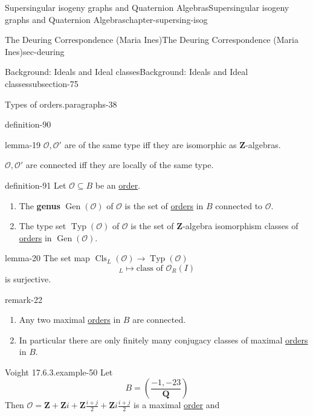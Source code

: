 \documentclass[oneside,10pt,]{book}
\newcommand{\terminology}[1]{\textbf{#1}}
\numberwithin{equation}{section}
\newcommand{\legendre}[2]{\left(\frac{#1}{#2}\right)}
\newcommand{\ZZ}{\mathbf{Z}}
\newcommand{\QQ}{\mathbf{Q}}
\newcommand{\ints}{\mathcal{O}}
\begin{document}
\begin{chapterptx}{Supersingular isogeny graphs and Quaternion Algebras}{}{Supersingular isogeny graphs and Quaternion Algebras}{}{}{chapter-supersing-isog}
\begin{sectionptx}{The Deuring Correspondence (Maria Ines)}{}{The Deuring Correspondence (Maria Ines)}{}{}{sec-deuring}
\begin{subsectionptx}{Background: Ideals and Ideal classes}{}{Background: Ideals and Ideal classes}{}{}{subsection-75}
\begin{paragraphs}{Types of orders.}{paragraphs-38}
\begin{definition}{}{definition-90}
\end{definition}
\begin{lemma}{}{}{lemma-19}%
\hypertarget{p-950}{}%
\(\ints,\ints'\) are of the same type iff they are isomorphic as \(\ZZ\)-algebras.%
\par
\hypertarget{p-951}{}%
\(\ints,\ints'\) are connected iff they are locally of the same type.%
\end{lemma}
\begin{definition}{}{definition-91}%
\hypertarget{p-952}{}%
Let \(\ints \subseteq B\) be an \hyperref[def-order-quaternion]{order}.\leavevmode%
\begin{enumerate}
\item\hypertarget{li-236}{}The \terminology{genus} \(\operatorname{Gen}(\ints)\) of \(\ints \) is the set of \hyperref[def-order-quaternion]{orders} in \(B \) connected to \(\ints\).%
\item\hypertarget{li-237}{}The type set \(\operatorname{Typ}(\ints)\) of \(\ints\) is the set of \(\ZZ\)-algebra isomorphism classes of \hyperref[def-order-quaternion]{orders} in \(\operatorname{Gen} (\ints)\).%
\end{enumerate}
%
\end{definition}
\begin{lemma}{}{}{lemma-20}%
\hypertarget{p-953}{}%
The set map \(\operatorname{Cls}_L(\ints) \to \operatorname{Typ}(\ints)\)%
\begin{equation*}
[ I]_L \mapsto \text{class of } \ints_R(I)
\end{equation*}
is surjective.%
\end{lemma}
\begin{remark}{}{remark-22}%
\hypertarget{p-954}{}%
\leavevmode%
\begin{enumerate}
\item\hypertarget{li-238}{}Any two maximal \hyperref[def-order-quaternion]{orders} in \(B\) are connected.%
\item\hypertarget{li-239}{}In particular there are only finitely many conjugacy classes of maximal \hyperref[def-order-quaternion]{orders} in \(B\).%
\end{enumerate}
%
\end{remark}
\begin{example}{Voight 17.6.3.}{example-50}%
\hypertarget{p-955}{}%
Let%
\begin{equation*}
B = \legendre{-1,-23}{\QQ}
\end{equation*}
Then \(\ints=  \ZZ +  \ZZ i + \ZZ \frac{i+j}{2} + \ZZ i \frac{i+j}{2}\) is a maximal \hyperref[def-order-quaternion]{order} and%

\end{example}
\end{paragraphs}
\end{subsectionptx}
\end{sectionptx}
\end{chapterptx}
\end{document}
